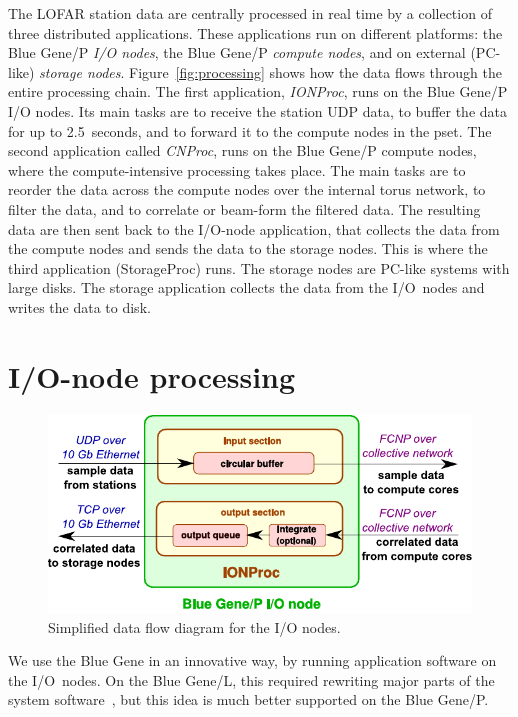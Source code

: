 \documentclass{sig-alternate}
\begin{document}
The LOFAR station data are centrally processed in real time by a collection
of three distributed applications.
These applications run on different platforms:
the Blue Gene/P \emph{I/O nodes}, the Blue Gene/P \emph{compute nodes}, and on
external (PC-like) \emph{storage nodes}.
Figure~\ref{fig:processing} shows how the data flows through the entire
processing chain.
The first application, \emph{IONProc}, runs on the Blue Gene/P I/O nodes.
Its main tasks are to receive the station UDP data, to buffer the data
for up to 2.5~seconds, and to forward it to the compute nodes in the pset.
The second application called \emph{CNProc}, runs on the Blue Gene/P compute nodes, where the
compute-intensive processing takes place.
The main tasks are to reorder the data across the compute nodes over the
internal torus network, to filter the data, and to correlate or beam-form
the filtered data.
The resulting data are then sent back to the I/O-node application, that
collects the data from the compute nodes and
sends the data to the storage nodes.
This is where the third application (StorageProc) runs.
The storage nodes are PC-like systems with large disks.
The storage application collects the data from the I/O~nodes and writes the
data to disk.


\section{I/O-node processing}
\label{sec:IONProc}

\begin{figure}[t]
\includegraphics[width=\columnwidth]{ION-processing.pdf}
\caption{Simplified data flow diagram for the I/O nodes.}
\label{fig:ion-processing}
\end{figure}

We use the Blue Gene in an innovative way, by running application software
on the I/O~nodes.
On the Blue Gene/L, this required rewriting major parts of the system
software~\cite{Iskra:08}, but this idea is much better supported on the
Blue Gene/P.
\end{document}
